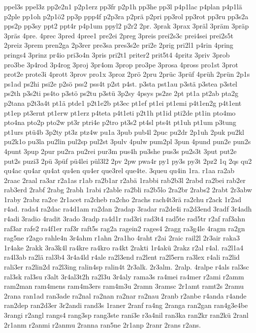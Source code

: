 {ppel3s
ppel3z
pp2e2n1
p2p1erz
pp3fr
p2p1h
pp3he
pp3l
p4p1lac
p4plan
p4p1lä
p2ple
pp1oh
p2p1ö2
pp3p
ppp4f
p2p3ra
p2prä
p2pri
pp3rol
pp3rot
pp3ru
pp3s2a
pps2p
pp3sy
ppt2
ppt4r
p4p1um
ppyl2
p2r2
2pr.
3prak
3prax
3präl
3präm
3präp
3präs
4pre.
4prec
3pred
4pree1
pre2ei
2preg
3preis
prei2s3c
prei4sei
prei2s5t
2preiz
3prem
pren2ga
2p3rer
pre3sa
pres3s2e
pri2e
2prig
pri2l1
p4rin
4pring
prings4
3prinz
pr4io
pri3o4n
3pris
pri2t1
priter2
prit5t4
4pritz
3priv
3prob
pro3be
3p4rod
3p4rog
3proj
3pr4om
3prop
pro3pe
3prosa
4pross
pro1st
3prot
prot2e
prote3i
4prott
3prov
pro1x
3proz
2prö
2pru
2prüc
3prüf
4prüh
2prün
2p1s
ps1ad
ps2hi
psi2e
p2sö
pss2
pss4t
p2st
p4st.
p3sta
pst1au
p3stä
p3stea
p3stel
ps2th
p3s2ti
ps4to
p3stö
ps2tu
p3stü
3p2sy
4psys
ps2ze
2pt
pt1a
pt2ab
pta2g
p2tana
p2t3a4t
pt1ä
ptde1
p2t1e2b
pt3ec
pt1ef
pt1ei
pt1emi
p4t1en2g
p4t1ent
pt1ep
pt3ernt
pt1erw
pt1erz
p4teta
p4t1eti
p2t1h
pt1id
pti2de
pt1in
pto4mo
pto4na
pto2p
pto2w
pt3r
ptri4e
p2tro
pt3s2
pt4sl
pts4t
pt1uh
pt1um
p3tung
pt1urs
ptü4b
3p2ty
pt3z
ptz4w
pu1a
3pub
pub4l
2puc
pu2dr
2p1uh
2puk
pu2kl
pu2k1o
pu3la
pu2lin
pul2sp
pul2st
3pulv
4pulw
pum2pl
3pun
4pund
pun2e
pun2s
4punt
3pup
2pur
pu2ra
pu2rei
pur3m
pus4h
pu3she
pus3s
pu2s3t
3put
put2e
put2s
puzi3
2pü
3püf
pü4lei
pül3l2
2pv
2pw
pwa4r
py1
py3s
py3t
2pz2
1q
2qs
qu2
qu4ac
qu4ar
qu4at
qu4en
qu4er
que3rel
que4te.
3queu
qu4in
1ra.
r1aa
ra2ab
2raac
2raal
ra3ar
r2a1as
r1ab
ra2b1ar
r2abä
1rabbi
rab2b3l
2rabd
ra2bei
rab2er
rab3erd
2rabf
2rabg
2rabh
1rabi
r2able
ra2bli
ra2b5lo
2ra2br
2rabs2
2rabt
2r3abw
1raby
2rabz
ra2ce
2r1acet
ra2cheb
ra2cho
2rachs
rach4t3rä
ra2chu
r2ack
1r2ad
r4ad.
rada4
ra2dac
ra4d1am
ra2dan
2radap
3radar
ra2de4i
ra2d3end
3radf
3r4adh
r4adi
3radio
4radit
3rado
3radp
ra4d1r
rad3ri
rad3t4
rad5te
rad5tr
r2af
raf3ahn
raf3ar
rafe2
ra4f1er
raf3r
raft5s
rag2a
ragein2
rages4
2ragg
ra3g4le
4ragm
ra2gn
rag5ne
r2ago
rahle4n
3r4ahm
r1ahn
2ra1ho
4raht
r2ai
2raic
rail2l
2r3air
raka3
1r4ake
2rakk
3ra3k4l
ra4kre
ra4kro
ra4kt
2rakti
1r4akü
2rakz
r2al
r4al.
ra2l1a4
ra4l3ab
ra2lä
ral3b4
3r4a4ld
r4ale
ra2l3end
ra2lent
ra2l5ern
ra3lex
r4ali
ra2lid
rali3er
ra2lin2d
ra2l3ing
ralin4sp
ralin4t
2r3alk.
2r3alm.
2ralp.
4ralpe
r4als
ral3sc
ral3sk
ral3su
r3alt
3r4al3t2h
ra2l3u
3r4aly
rama3s
ra4mei
ra4mer
r2ami
r2amm
ram2man
ram4mens
ram4m3ers
ram4m3u
2ramn
3ramsc
2r1amt
ramt2s
2ramu
2rana
ran1ad
ran3ade
ra2nal
ra2nan
ra2nar
ra2nau
2ranb
r2anbe
r4anda
r4ande
ran2dep
ran2d3er
3r2andi
rand3s
1raner
2ranf
ra4ng
2ranga
ran2gan
ran4g3e4be
3rangi
r2angl
rangs4
rang3sp
rang3ste
rani3e
r3a4nil
ran3ka
ran2kr
ran2kü
2ranl
2r1anm
r2anmi
r2anmu
2ranna
ran5ne
2r1anp
2ranr
2rans
r2ans.
}
